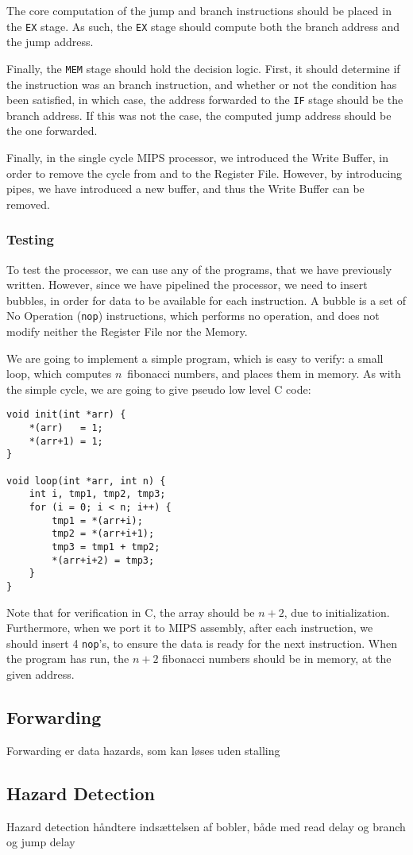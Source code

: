 The core computation of the jump and branch instructions should be placed in
the \texttt{EX} stage. As such, the \texttt{EX} stage should compute both the
branch address and the jump address.

Finally, the \texttt{MEM} stage should hold the decision logic. First, it
should determine if the instruction was an branch instruction, and whether or
not the condition has been satisfied, in which case, the  address forwarded to
the \texttt{IF} stage should be the branch address. If this was not the case,
the computed jump address should be the one forwarded.

Finally, in the single cycle MIPS processor, we introduced the Write Buffer, in
order to remove the cycle from and to the Register File. However, by
introducing pipes, we have introduced a new buffer, and thus the Write Buffer
can be removed.

\subsubsection*{Testing}
To test the processor, we can use any of the programs, that we have previously
written. However, since we have pipelined the processor, we need to insert
bubbles, in order for data to be available for each instruction. A bubble is a
set of No Operation (\texttt{nop}) instructions, which performs no operation,
and does not modify neither the Register File nor the Memory.

We are going to implement a simple program, which is easy to verify: a small
loop, which computes $n$ fibonacci numbers, and places them in memory. As with
the simple cycle, we are going to give pseudo low level C code:
\begin{lstlisting}
void init(int *arr) {
    *(arr)   = 1;
    *(arr+1) = 1;
}

void loop(int *arr, int n) {
    int i, tmp1, tmp2, tmp3;
    for (i = 0; i < n; i++) {
        tmp1 = *(arr+i);
        tmp2 = *(arr+i+1);
        tmp3 = tmp1 + tmp2;
        *(arr+i+2) = tmp3;
    }
}
\end{lstlisting}
Note that for verification in C, the array should be $n+2$, due to
initialization. Furthermore, when we port it to MIPS assembly, after each
instruction, we should insert 4 \texttt{nop}'s, to ensure the data is ready for
the next instruction. When the program has run, the $n+2$ fibonacci numbers
should be in memory, at the given address.

\subsection{Forwarding}\label{sec:forw}
Forwarding er data hazards, som kan løses uden stalling
\subsection{Hazard Detection}\label{sec:haz}
Hazard detection håndtere indsættelsen af bobler, både med read delay og branch
og jump delay
